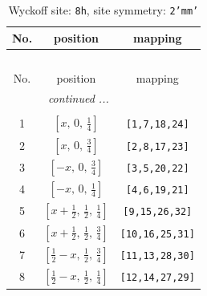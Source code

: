 \documentclass[fleqn,8pt]{jsarticle}
\begin{document}
\begin{longtable}{ccc}
\caption{Wyckoff site: {\tt 8h}, site symmetry: {\tt 2'mm'}}
 \\
 \hline \hline
No. & position & mapping \\ \hline \endfirsthead

\multicolumn{2}{l}{\tablename\ \thetable{}} \\
 \hline \hline
No. & position & mapping \\ \hline \endhead

 \hline \hline
\multicolumn{2}{r}{\footnotesize\it continued ...} \\ \endfoot

 \hline \hline
\multicolumn{2}{r}{} \\ \endlastfoot

1 & $\left[ x,\, 0,\, \frac{1}{4} \right]$ & {\tt [1,7,18,24]} \\ \hline
2 & $\left[ x,\, 0,\, \frac{3}{4} \right]$ & {\tt [2,8,17,23]} \\ \hline
3 & $\left[ - x,\, 0,\, \frac{3}{4} \right]$ & {\tt [3,5,20,22]} \\ \hline
4 & $\left[ - x,\, 0,\, \frac{1}{4} \right]$ & {\tt [4,6,19,21]} \\ \hline
5 & $\left[ x + \frac{1}{2},\, \frac{1}{2},\, \frac{1}{4} \right]$ & {\tt [9,15,26,32]} \\ \hline
6 & $\left[ x + \frac{1}{2},\, \frac{1}{2},\, \frac{3}{4} \right]$ & {\tt [10,16,25,31]} \\ \hline
7 & $\left[ \frac{1}{2} - x,\, \frac{1}{2},\, \frac{3}{4} \right]$ & {\tt [11,13,28,30]} \\ \hline
8 & $\left[ \frac{1}{2} - x,\, \frac{1}{2},\, \frac{1}{4} \right]$ & {\tt [12,14,27,29]} \\
\end{longtable}
\renewcommand{\arraystretch}{1.2}
\end{document}
